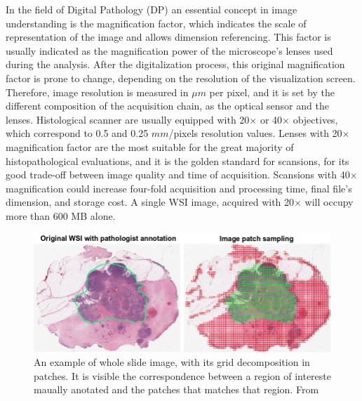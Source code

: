 \documentclass[12pt,a4paper]{report}
\begin{document}
In the field of Digital Pathology (DP) an essential concept in image understanding is the magnification factor, which indicates the scale of representation of the image and allows dimension referencing. This factor is usually indicated as the magnification power of the microscope's lenses used during the analysis. After the digitalization process, this original magnification factor is prone to change, depending on the resolution of the visualization screen. Therefore, image resolution is measured in $\mu m$ per pixel, and it is set by the different composition of the acquisition chain, as the optical sensor and the lenses. Histological scanner are usually equipped with 20$\times$ or 40$\times$ objectives, which correspond to 0.5 and 0.25 $mm$/pixels resolution values. Lenses with 20$\times$ magnification factor are the most suitable for the great majority of histopathological evaluations, and it is the golden standard for scansions, for its good trade-off between image quality and time of acquisition. Scansions with 40$\times$ magnification could increase four-fold acquisition and processing time, final file's dimension, and storage cost. A single WSI image, acquired with 20$\times$ will occupy more than 600 MB alone.

\begin{figure}
    \centering
    \includegraphics[width = \textwidth]{images/patches_grid}
    \caption{An example of whole slide image, with its grid decomposition in patches. It is visible the correspondence between a region of intereste maually anotated and the patches that matches that region. From \cite{WSI_grid}}
    \label{fig:patches_grid}
\end{figure}
\end{document}

